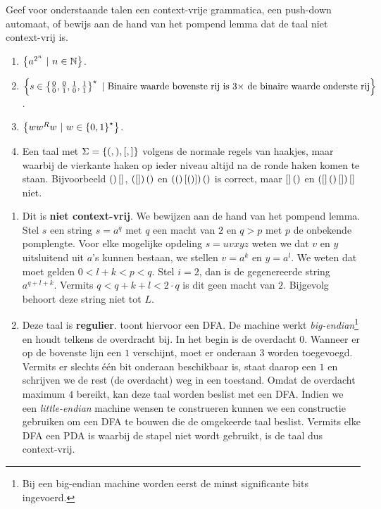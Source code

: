 \documentclass{article}
\begin{document}
\begin{question}
Geef voor onderstaande talen een context-vrije grammatica, een push-down automaat, of bewijs aan de hand van het pompend lemma dat de taal niet context-vrij is.
\begin{enumerate}
 \item $\left\{ a^{2^n}\ |\ n\in\mathbb{N} \right\}$.
 \item $\left\{ s\in\left\{ \tfrac{0}{0},\tfrac{0}{1},\tfrac{1}{0},\tfrac{1}{1} \right\}^{\star}\ |\ \mbox{Binaire waarde bovenste rij is $3\times$ de binaire waarde onderste rij} \right\}$.
 \item $\left\{ ww^Rw\ |\ w\in\left\{ 0,1 \right\}^{\star} \right\}$.
 \item Een taal met $\Sigma=\left\{ (,),[,] \right\}$ volgens de normale regels van haakjes, maar waarbij de vierkante haken op ieder niveau altijd na de ronde haken komen te staan. Bijvoorbeeld $\left(  \right)\left[  \right]$, $\left( \left[  \right] \right){\left(  \right)}$ en $\left( \left(  \right)\left[ \left(  \right) \right] \right)\left(  \right)$ is correct, maar $\left[  \right]\left(  \right)$ en $\left( \left[  \right]\left(  \right)\left[  \right] \right)\left[  \right]$ niet.
\end{enumerate}
\begin{answer}
\begin{enumerate}
 \item Dit is \textbf{niet context-vrij}. We bewijzen aan de hand van het pompend lemma. Stel $s$ een string $s=a^q$ met $q$ een macht van $2$ en $q>p$ met $p$ de onbekende pomplengte. Voor elke mogelijke opdeling $s=uvxyz$ weten we dat $v$ en $y$ uitsluitend uit $a$'s kunnen bestaan, we stellen $v=a^k$ en $y=a^l$. We weten dat moet gelden $0<l+k<p<q$. Stel $i=2$, dan is de gegenereerde string $a^{q+l+k}$. Vermits $q<q+k+l<2\cdot q$ is dit geen macht van $2$. Bijgevolg behoort deze string niet tot $L$.
 \item Deze taal is \textbf{regulier}. toont hiervoor een DFA. De machine werkt \emph{big-endian}\footnote{Bij een big-endian machine worden eerst de minst significante bits ingevoerd.} en houdt telkens de overdracht bij. In het begin is de overdacht $0$. Wanneer er op de bovenste lijn een $1$ verschijnt, moet er onderaan $3$ worden toegevoegd. Vermits er slechts \'e\'en bit onderaan beschikbaar is, staat daarop een $1$ en schrijven we de rest (de overdacht) weg in een toestand. Omdat de overdacht maximum $4$ bereikt, kan deze taal worden beslist met een DFA. Indien we een \emph{little-endian} machine wensen te construeren kunnen we een constructie gebruiken om een DFA te bouwen die de omgekeerde taal beslist. Vermits elke DFA een PDA is waarbij de stapel niet wordt gebruikt, is de taal dus context-vrij.\\

\end{enumerate}
\end{answer}
\end{question}
\end{document}
